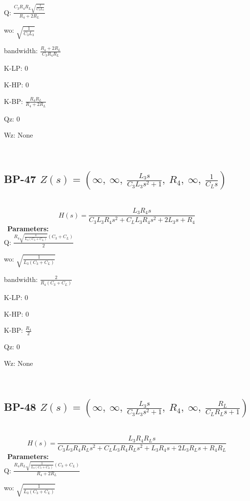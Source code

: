 \documentclass{article}
\begin{document}
Q: $\frac{C_{3} R_{4} R_{L} \sqrt{\frac{1}{C_{3} L_{3}}}}{R_{4} + 2 R_{L}}$\ 

wo: $\sqrt{\frac{1}{C_{3} L_{3}}}$\ 

bandwidth: $\frac{R_{4} + 2 R_{L}}{C_{3} R_{4} R_{L}}$\ 

K-LP: $0$\ 

K-HP: $0$\ 

K-BP: $\frac{R_{4} R_{L}}{R_{4} + 2 R_{L}}$\ 

Qz: $0$\ 

Wz: $\text{None}$\ 

\ 

\subsection{BP-47 $Z(s) = \left( \infty, \  \infty, \  \frac{L_{3} s}{C_{3} L_{3} s^{2} + 1}, \  R_{4}, \  \infty, \  \frac{1}{C_{L} s}\right)$ } \ 
\textbf{\[H(s) = \frac{L_{3} R_{4} s}{C_{3} L_{3} R_{4} s^{2} + C_{L} L_{3} R_{4} s^{2} + 2 L_{3} s + R_{4}}\] } \ 
\textbf{Parameters:}\\ 

Q: $\frac{R_{4} \sqrt{\frac{1}{L_{3} \left(C_{3} + C_{L}\right)}} \left(C_{3} + C_{L}\right)}{2}$\ 

wo: $\sqrt{\frac{1}{L_{3} \left(C_{3} + C_{L}\right)}}$\ 

bandwidth: $\frac{2}{R_{4} \left(C_{3} + C_{L}\right)}$\ 

K-LP: $0$\ 

K-HP: $0$\ 

K-BP: $\frac{R_{4}}{2}$\ 

Qz: $0$\ 

Wz: $\text{None}$\ 

\ 

\subsection{BP-48 $Z(s) = \left( \infty, \  \infty, \  \frac{L_{3} s}{C_{3} L_{3} s^{2} + 1}, \  R_{4}, \  \infty, \  \frac{R_{L}}{C_{L} R_{L} s + 1}\right)$ } \ 
\textbf{\[H(s) = \frac{L_{3} R_{4} R_{L} s}{C_{3} L_{3} R_{4} R_{L} s^{2} + C_{L} L_{3} R_{4} R_{L} s^{2} + L_{3} R_{4} s + 2 L_{3} R_{L} s + R_{4} R_{L}}\] } \ 
\textbf{Parameters:}\\ 

Q: $\frac{R_{4} R_{L} \sqrt{\frac{1}{L_{3} \left(C_{3} + C_{L}\right)}} \left(C_{3} + C_{L}\right)}{R_{4} + 2 R_{L}}$\ 

wo: $\sqrt{\frac{1}{L_{3} \left(C_{3} + C_{L}\right)}}$\ 
\end{document}
